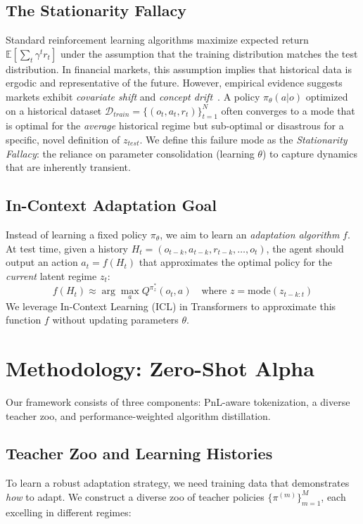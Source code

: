 \documentclass{article}
\begin{document}
\subsection{The Stationarity Fallacy}
Standard reinforcement learning algorithms maximize expected return $\mathbb{E}[\sum_t \gamma^t r_t]$ under the assumption that the training distribution matches the test distribution. In financial markets, this assumption implies that historical data is ergodic and representative of the future. However, empirical evidence suggests markets exhibit \emph{covariate shift} and \emph{concept drift}~\citep{khetarpal2022continual}.
A policy $\pi_\theta(a|o)$ optimized on a historical dataset $\mathcal{D}_{train} = \{(o_t, a_t, r_t)\}_{t=1}^{N}$ often converges to a mode that is optimal for the \emph{average} historical regime but sub-optimal or disastrous for a specific, novel definition of $z_{test}$. We define this failure mode as the \emph{Stationarity Fallacy}: the reliance on parameter consolidation (learning $\theta$) to capture dynamics that are inherently transient.

\subsection{In-Context Adaptation Goal}
Instead of learning a fixed policy $\pi_\theta$, we aim to learn an \emph{adaptation algorithm} $f$. At test time, given a history $H_t = (o_{t-k}, a_{t-k}, r_{t-k}, \dots, o_t)$, the agent should output an action $a_t = f(H_t)$ that approximates the optimal policy for the \emph{current} latent regime $z_t$:
\begin{equation}
    f(H_t) \approx \arg\max_a Q^{\pi^*_z}(o_t, a) \quad \text{where } z = \text{mode}(z_{t-k:t})
\end{equation}
We leverage In-Context Learning (ICL) in Transformers to approximate this function $f$ without updating parameters $\theta$.

\section{Methodology: Zero-Shot Alpha}
\label{sec:method}

Our framework consists of three components: PnL-aware tokenization, a diverse teacher zoo, and performance-weighted algorithm distillation.

\subsection{Teacher Zoo and Learning Histories}
To learn a robust adaptation strategy, we need training data that demonstrates \emph{how} to adapt. We construct a diverse zoo of teacher policies $\{\pi^{(m)}\}_{m=1}^M$, each excelling in different regimes:
\end{document}
